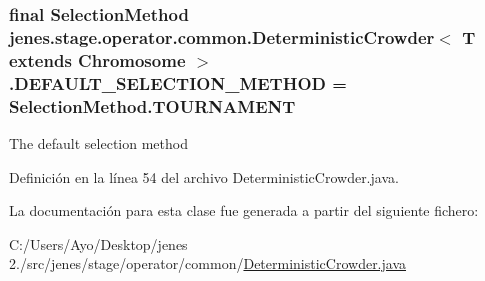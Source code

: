 \hypertarget{classjenes_1_1stage_1_1operator_1_1common_1_1_deterministic_crowder_3_01_t_01extends_01_chromosome_01_4_a5ca3f3abce0f3163383ed9158b154289}{
\subsubsection[{D\-E\-F\-A\-U\-L\-T\-\_\-\-S\-E\-L\-E\-C\-T\-I\-O\-N\-\_\-\-M\-E\-T\-H\-O\-D}]{\setlength{\rightskip}{0pt plus 5cm}final Selection\-Method jenes.\-stage.\-operator.\-common.\-Deterministic\-Crowder$<$ T extends Chromosome $>$.D\-E\-F\-A\-U\-L\-T\-\_\-\-S\-E\-L\-E\-C\-T\-I\-O\-N\-\_\-\-M\-E\-T\-H\-O\-D = Selection\-Method.\-T\-O\-U\-R\-N\-A\-M\-E\-N\-T\hspace{0.3cm}{\ttfamily [static]}}}\label{classjenes_1_1stage_1_1operator_1_1common_1_1_deterministic_crowder_3_01_t_01extends_01_chromosome_01_4_a5ca3f3abce0f3163383ed9158b154289}
The default selection method 

Definición en la línea 54 del archivo Deterministic\-Crowder.\-java.



La documentación para esta clase fue generada a partir del siguiente fichero\-:\begin{DoxyCompactItemize}
\item 
C\-:/\-Users/\-Ayo/\-Desktop/jenes 2./src/jenes/stage/operator/common/\hyperlink{_deterministic_crowder_8java}{Deterministic\-Crowder.\-java}\end{DoxyCompactItemize}
